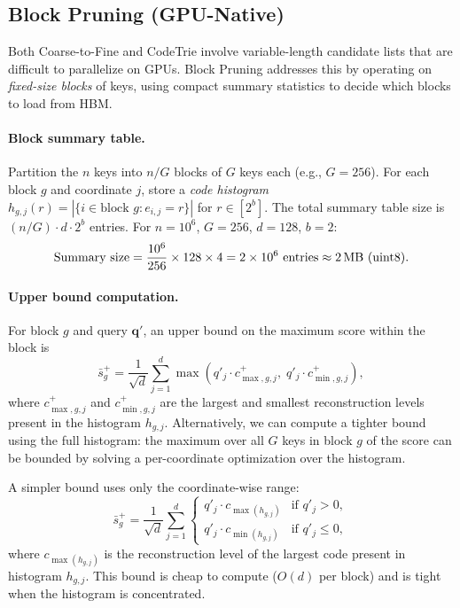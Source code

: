 \documentclass[10pt,twocolumn]{article}
\theoremstyle{definition}
\newcommand{\bq}{\mathbf{q}}
\begin{document}
\subsection{Block Pruning (GPU-Native)}
\label{sec:block_pruning}

Both Coarse-to-Fine and CodeTrie involve variable-length candidate lists that are
difficult to parallelize on GPUs.  Block Pruning addresses this by operating on
\emph{fixed-size blocks} of keys, using compact summary statistics to decide
which blocks to load from HBM.

\paragraph{Block summary table.}
Partition the $n$ keys into $n/G$ blocks of $G$ keys each (e.g., $G = 256$).
For each block $g$ and coordinate $j$, store a \emph{code histogram}
$h_{g,j}(r) = |\{i \in \text{block } g : e_{i,j} = r\}|$ for $r \in [2^b]$.
The total summary table size is $(n/G) \cdot d \cdot 2^b$ entries.  For
$n = 10^6$, $G = 256$, $d = 128$, $b = 2$:
\begin{equation}
  \text{Summary size} = \frac{10^6}{256} \times 128 \times 4
    = 2 \times 10^6 \text{ entries} \approx 2\text{\,MB (uint8)}.
\end{equation}

\paragraph{Upper bound computation.}
For block $g$ and query $\bq'$, an upper bound on the maximum score within the
block is
\begin{equation}
  \label{eq:block_upper}
  \bar{s}_g^+ = \frac{1}{\sqrt{d}} \sum_{j=1}^{d} \max\!\left(
    q'_j \cdot c_{\max,g,j}^{+},\; q'_j \cdot c_{\min,g,j}^{+}\right),
\end{equation}
where $c_{\max,g,j}^{+}$ and $c_{\min,g,j}^{+}$ are the largest and smallest
reconstruction levels present in the histogram $h_{g,j}$.  Alternatively, we can
compute a tighter bound using the full histogram: the maximum over all $G$ keys
in block $g$ of the score can be bounded by solving a per-coordinate optimization
over the histogram.

A simpler bound uses only the coordinate-wise range:
\begin{equation}
  \bar{s}_g^+ = \frac{1}{\sqrt{d}} \sum_{j=1}^{d}
    \begin{cases}
      q'_j \cdot c_{\max(h_{g,j})} & \text{if } q'_j > 0, \\
      q'_j \cdot c_{\min(h_{g,j})} & \text{if } q'_j \leq 0,
    \end{cases}
\end{equation}
where $c_{\max(h_{g,j})}$ is the reconstruction level of the largest code
present in histogram $h_{g,j}$.  This bound is cheap to compute ($O(d)$ per
block) and is tight when the histogram is concentrated.
\end{document}
